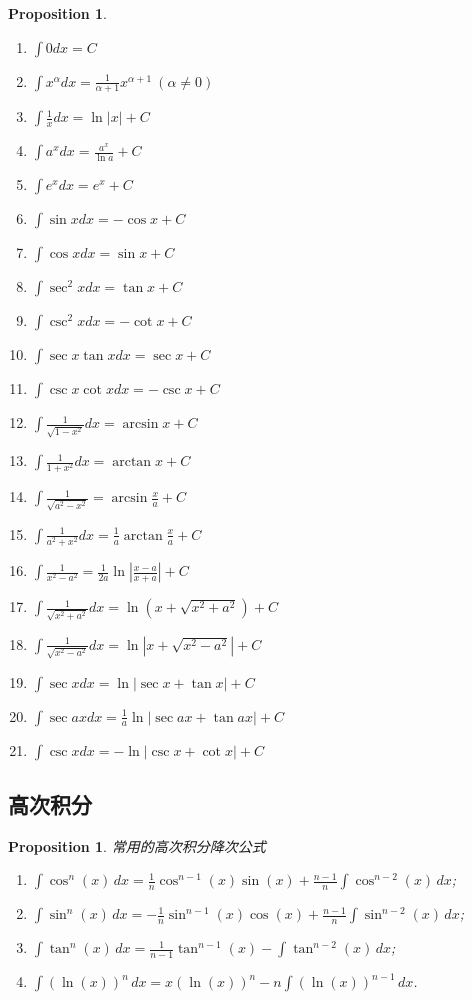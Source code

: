 \documentclass{article}
\newtheorem{proposition}[theorem]{Proposition}
\begin{document}
\begin{proposition}
\rm \
\begin{enumerate}
	\item $\int 0dx = C$
 	\item $\int x^{\alpha}dx = \frac{1}{\alpha+1}x^{\alpha+1}~(\alpha \neq 0)$ 
	\item $\int \frac{1}{x} dx = \ln |x| + C$
	\item $\int a^{x}dx = \frac{a^x}{\ln a} + C$
	\item $\int e^x dx = e^x + C$
	\item $\int \sin x dx = -\cos x + C$
	\item $\int \cos x dx = \sin x + C$
	\item $\int \sec^2 x dx = \tan x +C$
	\item $\int \csc^2 x dx = -\cot x + C$
	\item $\int \sec x\tan x dx = \sec x +C$
	\item $\int \csc x\cot x dx = -\csc x + C$
	\item $\int \frac{1}{\sqrt{1-x^2}}dx = \arcsin x+C$
	\item $\int \frac{1}{1+x^2}dx = \arctan x + C$
	\item $\int \frac{1}{\sqrt{a^2 -x^2}} = \arcsin \frac{x}{a} + C$
	\item $\int \frac{1}{a^2 + x^2}dx = \frac{1}{a}\arctan \frac{x}{a} + C$
	\item $\int \frac{1}{x^2 - a^2} =\frac{1}{2a} \ln \left| \frac{x-a}{x+a}\right|+C$
	\item $\int \frac{1}{\sqrt{x^2 + a^2}}dx = \ln(x+\sqrt{x^2 + a^2})+C$
	\item $\int \frac{1}{\sqrt{x^2 - a^2}}dx = \ln \left| x+ \sqrt{x^2 - a^2}\right|+C$
	\item $\int \sec x dx = \ln |\sec x + \tan x|+C$
	\item $\int \sec ax dx = \frac{1}{a}\ln |\sec ax + \tan ax|+C$
	\item $\int \csc x dx = -\ln|\csc x + \cot x|+C$
\end{enumerate}
\end{proposition}

\subsection{高次积分}

\begin{proposition}
\rm 常用的高次积分降次公式
\begin{enumerate}
	\item $\int \cos ^{n}(x)\,dx={\frac  {1}{n}}\cos ^{{n-1}}(x)\sin(x)+{\frac  {n-1}{n}}\int \cos ^{{n-2}}(x)\,dx$;
	\item $\int \sin ^{n}(x)\,dx=-{\frac  {1}{n}}\sin ^{{n-1}}(x)\cos(x)+{\frac  {n-1}{n}}\int \sin ^{{n-2}}(x)\,dx$;
	\item $\int \tan ^{n}(x)\,dx={\frac  {1}{n-1}}\tan ^{{n-1}}(x)-\int \tan ^{{n-2}}(x)\,dx$;
	\item $\int (\ln(x))^{n}\,dx=x(\ln(x))^{n}-n\int (\ln(x))^{{n-1}}\,dx$.
\end{enumerate}
\end{proposition}
\end{document}
